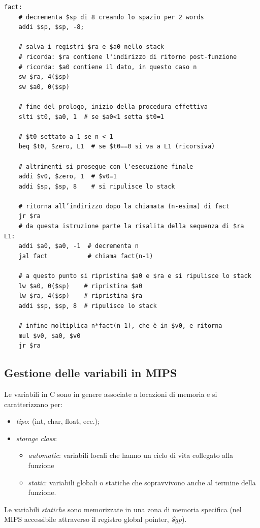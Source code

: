 \documentclass[class=book, crop=false]{standalone}
\begin{document}
\begin{verbatim}
fact:
	# decrementa $sp di 8 creando lo spazio per 2 words
	addi $sp, $sp, -8;

	# salva i registri $ra e $a0 nello stack
	# ricorda: $ra contiene l'indirizzo di ritorno post-funzione
	# ricorda: $a0 contiene il dato, in questo caso n
	sw $ra, 4($sp)
	sw $a0, 0($sp)

	# fine del prologo, inizio della procedura effettiva
	slti $t0, $a0, 1  # se $a0<1 setta $t0=1

	# $t0 settato a 1 se n < 1
	beq $t0, $zero, L1  # se $t0==0 si va a L1 (ricorsiva)

	# altrimenti si prosegue con l'esecuzione finale
	addi $v0, $zero, 1  # $v0=1
	addi $sp, $sp, 8    # si ripulisce lo stack

	# ritorna all’indirizzo dopo la chiamata (n-esima) di fact
	jr $ra
	# da questa istruzione parte la risalita della sequenza di $ra
L1:
	addi $a0, $a0, -1  # decrementa n
	jal fact           # chiama fact(n-1)

	# a questo punto si ripristina $a0 e $ra e si ripulisce lo stack
	lw $a0, 0($sp)    # ripristina $a0
	lw $ra, 4($sp)    # ripristina $ra
	addi $sp, $sp, 8  # ripulisce lo stack

	# infine moltiplica n*fact(n-1), che è in $v0, e ritorna
	mul $v0, $a0, $v0
	jr $ra
\end{verbatim}

\subsection{Gestione delle variabili in MIPS}
Le variabili in C sono in genere associate a locazioni di memoria e si caratterizzano per:
\begin{itemize}
	\item \emph{tipo}: (int, char, float, ecc.);
	\item \emph{storage class}:
	\begin{itemize}
		\item \emph{automatic}: variabili locali che hanno un ciclo di vita collegato alla funzione
		\item \emph{static}: variabili globali o statiche che sopravvivono anche al termine della funzione.
	\end{itemize}
\end{itemize}

Le variabili \emph{statiche} sono memorizzate in una zona di memoria specifica (nel MIPS accessibile attraverso il registro global pointer, \emph{\$gp}).
\end{document}
